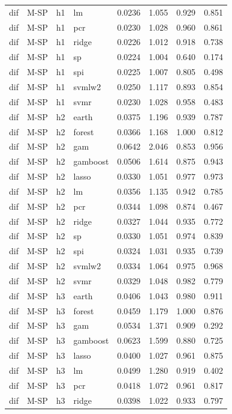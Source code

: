 \begin{ThreePartTable}
\begin{longtable}[t]{llclcccc}
dif & M-SP & h1 & lm & 0.0236 & 1.055 & 0.929 & 0.851\\
dif & M-SP & h1 & pcr & 0.0230 & 1.028 & 0.960 & 0.861\\
dif & M-SP & h1 & ridge & 0.0226 & 1.012 & 0.918 & 0.738\\
dif & M-SP & h1 & sp & 0.0224 & 1.004 & 0.640 & 0.174\\
dif & M-SP & h1 & spi & 0.0225 & 1.007 & 0.805 & 0.498\\
dif & M-SP & h1 & svmlw2 & 0.0250 & 1.117 & 0.893 & 0.854\\
dif & M-SP & h1 & svmr & 0.0230 & 1.028 & 0.958 & 0.483\\
\addlinespace
dif & M-SP & h2 & earth & 0.0375 & 1.196 & 0.939 & 0.787\\
dif & M-SP & h2 & forest & 0.0366 & 1.168 & 1.000 & 0.812\\
dif & M-SP & h2 & gam & 0.0642 & 2.046 & 0.853 & 0.956\\
dif & M-SP & h2 & gamboost & 0.0506 & 1.614 & 0.875 & 0.943\\
dif & M-SP & h2 & lasso & 0.0330 & 1.051 & 0.977 & 0.973\\
dif & M-SP & h2 & lm & 0.0356 & 1.135 & 0.942 & 0.785\\
dif & M-SP & h2 & pcr & 0.0344 & 1.098 & 0.874 & 0.467\\
dif & M-SP & h2 & ridge & 0.0327 & 1.044 & 0.935 & 0.772\\
dif & M-SP & h2 & sp & 0.0330 & 1.051 & 0.974 & 0.839\\
dif & M-SP & h2 & spi & 0.0324 & 1.031 & 0.935 & 0.739\\
dif & M-SP & h2 & svmlw2 & 0.0334 & 1.064 & 0.975 & 0.968\\
dif & M-SP & h2 & svmr & 0.0329 & 1.048 & 0.982 & 0.779\\
\addlinespace
dif & M-SP & h3 & earth & 0.0406 & 1.043 & 0.980 & 0.911\\
dif & M-SP & h3 & forest & 0.0459 & 1.179 & 1.000 & 0.876\\
dif & M-SP & h3 & gam & 0.0534 & 1.371 & 0.909 & 0.292\\
dif & M-SP & h3 & gamboost & 0.0623 & 1.599 & 0.880 & 0.725\\
dif & M-SP & h3 & lasso & 0.0400 & 1.027 & 0.961 & 0.875\\
dif & M-SP & h3 & lm & 0.0499 & 1.280 & 0.919 & 0.402\\
dif & M-SP & h3 & pcr & 0.0418 & 1.072 & 0.961 & 0.817\\
dif & M-SP & h3 & ridge & 0.0398 & 1.022 & 0.933 & 0.797\\

\end{longtable}
\end{ThreePartTable}

